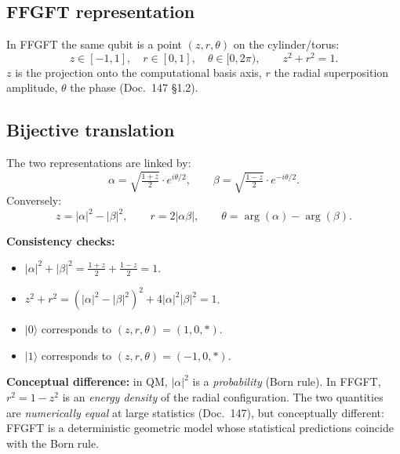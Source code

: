 \subsection{FFGFT representation}

In FFGFT the same qubit is a point $(z, r, \theta)$ on the
cylinder/torus:
\begin{equation}
  z \in [-1, 1], \quad r \in [0, 1], \quad \theta \in [0, 2\pi),
  \qquad
  z^2 + r^2 = 1.
\end{equation}
$z$ is the projection onto the computational basis axis, $r$ the
radial superposition amplitude, $\theta$ the phase (Doc.~147 §1.2).

\subsection{Bijective translation}

The two representations are linked by:
\begin{equation}
  \boxed{
  \alpha = \sqrt{\tfrac{1+z}{2}} \cdot e^{i\theta/2},
  \qquad
  \beta = \sqrt{\tfrac{1-z}{2}} \cdot e^{-i\theta/2}.}
  \label{eq:state-bridge}
\end{equation}
Conversely:
\begin{equation}
  z = |\alpha|^2 - |\beta|^2,
  \qquad
  r = 2|\alpha\beta|,
  \qquad
  \theta = \arg(\alpha) - \arg(\beta).
\end{equation}

\textbf{Consistency checks:}
\begin{itemize}[leftmargin=2em,itemsep=2pt,topsep=2pt]
  \item $|\alpha|^2 + |\beta|^2 = \tfrac{1+z}{2} + \tfrac{1-z}{2} = 1$. \checkmark
  \item $z^2 + r^2 = (|\alpha|^2 - |\beta|^2)^2 + 4|\alpha|^2|\beta|^2 = 1$. \checkmark
  \item $|0\rangle$ corresponds to $(z,r,\theta) = (1, 0, *)$. \checkmark
  \item $|1\rangle$ corresponds to $(z,r,\theta) = (-1, 0, *)$. \checkmark
\end{itemize}

\textbf{Conceptual difference:} in QM, $|\alpha|^2$ is a
\emph{probability} (Born rule). In FFGFT, $r^2 = 1 - z^2$ is an
\emph{energy density} of the radial configuration. The two
quantities are \emph{numerically equal} at large statistics
(Doc.~147), but conceptually different: FFGFT is a deterministic
geometric model whose statistical predictions coincide with the
Born rule.

